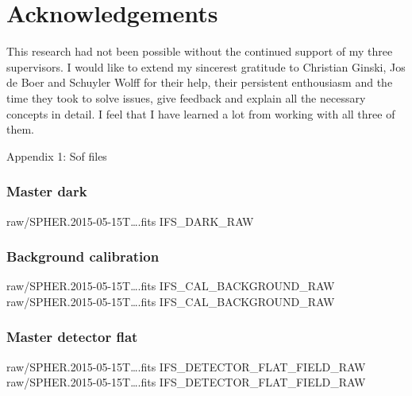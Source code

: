 \documentclass[twoside,single]{lion-msc}
\begin{document}
\clearpage
\section*{Acknowledgements}
\small
This research had not been possible without the continued support of my three supervisors. I would like to extend my sincerest gratitude to Christian Ginski, Jos de Boer and Schuyler Wolff for their help, their persistent enthousiasm and the time they took to solve issues, give feedback and explain all the necessary concepts in detail. I feel that I have learned a lot from working with all three of them.

\clearpage



\clearpage
\huge{Appendix 1: Sof files}
\small
\subsubsection*{Master dark}
\begin{mdframed}[linewidth = 0.3mm, linecolor = black]
raw/SPHER.2015-05-15T\dots.fits IFS\_DARK\_RAW
\end{mdframed}

\subsubsection*{Background calibration}
\begin{mdframed}[linewidth = 0.3mm, linecolor = black]
raw/SPHER.2015-05-15T\dots.fits IFS\_CAL\_BACKGROUND\_RAW\\
raw/SPHER.2015-05-15T\dots.fits IFS\_CAL\_BACKGROUND\_RAW
\end{mdframed}

\subsubsection*{Master detector flat}
\begin{mdframed}[linewidth = 0.3mm, linecolor = black]
raw/SPHER.2015-05-15T\dots.fits IFS\_DETECTOR\_FLAT\_FIELD\_RAW\\
raw/SPHER.2015-05-15T\dots.fits IFS\_DETECTOR\_FLAT\_FIELD\_RAW
\end{mdframed}
\end{document}
